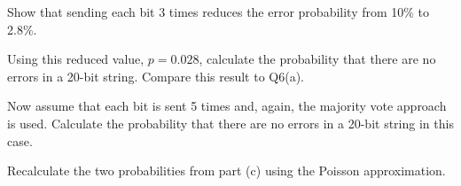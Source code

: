 \item  Show that sending each bit 3 times reduces the error probability from 10\% to 2.8\%. 
\\ \item  Using this reduced value, $p=0.028$, calculate the probability that there are no errors in a 20-bit string. Compare this result to Q6(a). 
 \item  Now assume that each bit is sent 5 times and, again, the majority vote approach is used. Calculate the probability that there are no errors in a 20-bit string in this case. %
 \item  Recalculate the two probabilities from part (c) using the Poisson approximation.

